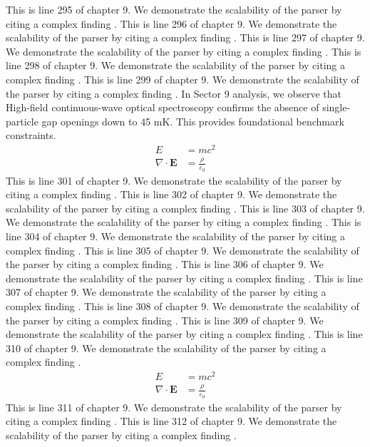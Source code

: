 This is line 295 of chapter 9. We demonstrate the scalability of the parser by citing a complex finding \cite{ref9_295}.
This is line 296 of chapter 9. We demonstrate the scalability of the parser by citing a complex finding \cite{ref9_296}.
This is line 297 of chapter 9. We demonstrate the scalability of the parser by citing a complex finding \cite{ref9_297}.
This is line 298 of chapter 9. We demonstrate the scalability of the parser by citing a complex finding \cite{ref9_298}.
This is line 299 of chapter 9. We demonstrate the scalability of the parser by citing a complex finding \cite{ref9_299}.
In Sector 9 analysis, we observe that High-field continuous-wave optical spectroscopy confirms the absence of single-particle gap openings down to 45 mK. This provides foundational benchmark constraints.
\begin{align*}
  E &= mc^2 \\
  \nabla \cdot \mathbf{E} &= \frac{\rho}{\varepsilon_0}
\end{align*}
This is line 301 of chapter 9. We demonstrate the scalability of the parser by citing a complex finding \cite{ref9_301}.
This is line 302 of chapter 9. We demonstrate the scalability of the parser by citing a complex finding \cite{ref9_302}.
This is line 303 of chapter 9. We demonstrate the scalability of the parser by citing a complex finding \cite{ref9_303}.
This is line 304 of chapter 9. We demonstrate the scalability of the parser by citing a complex finding \cite{ref9_304}.
This is line 305 of chapter 9. We demonstrate the scalability of the parser by citing a complex finding \cite{ref9_305}.
This is line 306 of chapter 9. We demonstrate the scalability of the parser by citing a complex finding \cite{ref9_306}.
This is line 307 of chapter 9. We demonstrate the scalability of the parser by citing a complex finding \cite{ref9_307}.
This is line 308 of chapter 9. We demonstrate the scalability of the parser by citing a complex finding \cite{ref9_308}.
This is line 309 of chapter 9. We demonstrate the scalability of the parser by citing a complex finding \cite{ref9_309}.
This is line 310 of chapter 9. We demonstrate the scalability of the parser by citing a complex finding \cite{ref9_310}.
\begin{align*}
  E &= mc^2 \\
  \nabla \cdot \mathbf{E} &= \frac{\rho}{\varepsilon_0}
\end{align*}
This is line 311 of chapter 9. We demonstrate the scalability of the parser by citing a complex finding \cite{ref9_311}.
This is line 312 of chapter 9. We demonstrate the scalability of the parser by citing a complex finding \cite{ref9_312}.
